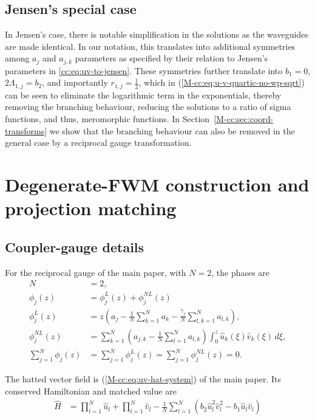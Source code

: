 \documentclass[11pt,a4paper]{article}
\newcommand{\externaleqref}[1]{\textup{(\ref*{#1})}}
\begin{document}
\subsection{Jensen's special case}

In Jensen's case, there is notable simplification in the solutions as the waveguides are made identical.
In our notation, this translates into additional symmetries among $a_j$ and $a_{j,k}$ parameters as specified by their relation to Jensen's parameters in \eqref{cc:eq:uv-to-jensen}.
These symmetries further translate into $b_1=0$, $2\Lambda_{1,j}=b_2$, and importantly $r_{1,j} = \frac{1}{2}$, which in \externaleqref{M-cc:eq:u-v-quartic-no-wp-sqrt} can be seen to eliminate the logarithmic term in the exponentials, thereby removing the branching behaviour, reducing the solutions to a ratio of sigma functions, and thus, meromorphic functions.
In Section~\ref*{M-cc:sec:coord-transforms} we show that the branching behaviour can also be removed in the general case by a reciprocal gauge transformation.



\section{Degenerate-FWM construction and projection matching}\label{supp:sec:projection}
\subsection{Coupler-gauge details}
For the reciprocal gauge of the main paper, with $N=2$, the phases are
\begin{align}
N &= 2, \\
\phi_j(z) &= \phi_j^{L}(z) + \phi_j^{NL}(z) \\
\phi_j^{L}(z) &= z\left({a}_{j} - \frac{1}{N}\sum_{k=1}^{N} a_{k} - \frac{{\gamma}_{j}}{N} \sum\limits_{l,k=1}^{N} a_{l,k}\right), \\
\phi_j^{NL}(z)  &= \sum_{k=1}^{N} \left({a}_{j,k} - \frac{1}{N}\sum_{l=1}^{N} {a}_{l,k}\right) \int_0^z \hat{u}_k (\xi) \hat{v}_k (\xi) \, d\xi, \\
\sum_{j=1}^{N} \phi_j(z) &= \sum_{j=1}^{N} \phi_j^{L}(z) = \sum_{j=1}^{N} \phi_j^{NL}(z) =0.
\end{align}

The hatted vector field is \externaleqref{M-cc:eq:uv-hat-system} of the main paper. Its conserved Hamiltonian and matched value are
\begin{align}
\hat{H} &= \prod_{l=1}^{N} \hat{u}_l + \prod_{l=1}^{N} \hat{v}_l - \frac{1}{N}\sum_{l=1}^{N} \left(b_2 \hat{u}^{2}_l \hat{v}^{2}_l  - b_1 \hat{u}_l \hat{v}_l \right)
\end{align}
\end{document}
